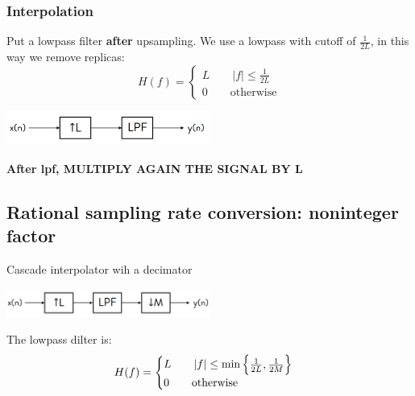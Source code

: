     \subsubsection{Interpolation}
    Put a lowpass filter \textbf{after} upsampling. We use a lowpass with cutoff of $\frac{1}{2L}$, in this way we remove replicas:
    $$
    H(f)=\begin{cases}
        L\qquad|f|\leq\frac{1}{2L}\\
        0\qquad\text{otherwise}
    \end{cases}
    $$
    \begin{center}
        \includegraphics[width=0.5\textwidth]{images/upsampling_Interpolation.png}
    \end{center}
    \textbf{After lpf, MULTIPLY AGAIN THE SIGNAL BY L}

\subsection{Rational sampling rate conversion: noninteger factor}
    Cascade interpolator wih a decimator
    \begin{center}
        \includegraphics[width=0.5\textwidth]{images/rationalsampling.png}
    \end{center}
    The lowpass dilter is:
    $$
    H(f)=\begin{cases}
        L\qquad|f|\leq\min\begin{Bmatrix} {\frac{1}{2L},\frac{1}{2M}} \end{Bmatrix}\\
        0\qquad\text{otherwise}
    \end{cases}
    $$
